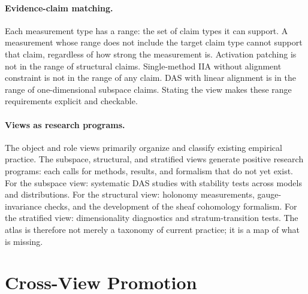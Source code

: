 \documentclass[11pt]{article}
\theoremstyle{remark}
\begin{document}
\paragraph{Evidence-claim matching.}
Each measurement type has a range: the set of claim types it can support.
A measurement whose range does not include the target claim type cannot
support that claim, regardless of how strong the measurement is.
Activation patching is not in the range of structural claims.
Single-method IIA without alignment constraint is not in the range of
any claim.  DAS with linear alignment is in the range of
one-dimensional subspace claims.  Stating the view makes these
range requirements explicit and checkable.

\paragraph{Views as research programs.}
The object and role views primarily organize and classify existing
empirical practice.  The subspace, structural, and stratified views
generate positive research programs: each calls for methods, results,
and formalism that do not yet exist.  For the subspace view: systematic
DAS studies with stability tests across models and distributions.  For
the structural view: holonomy measurements, gauge-invariance checks,
and the development of the sheaf cohomology formalism.  For the
stratified view: dimensionality diagnostics and stratum-transition
tests.  The atlas is therefore not merely a taxonomy of current
practice; it is a map of what is missing.

\section{Cross-View Promotion}\label{sec:promotion}
\end{document}
